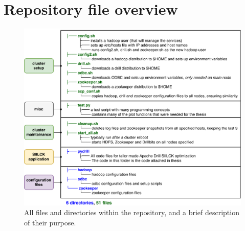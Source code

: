 \documentclass[a4paper,english]{report}
\begin{document}
\section{Repository file overview}
\begin{figure}[H]
	\centering
	\includegraphics[width=\textwidth]{repo_tree}
	\caption{All files and directories within the repository, and a brief description of their purpose.}
	\label{fig:repotree}
\end{figure}
\pagebreak
\end{document}

